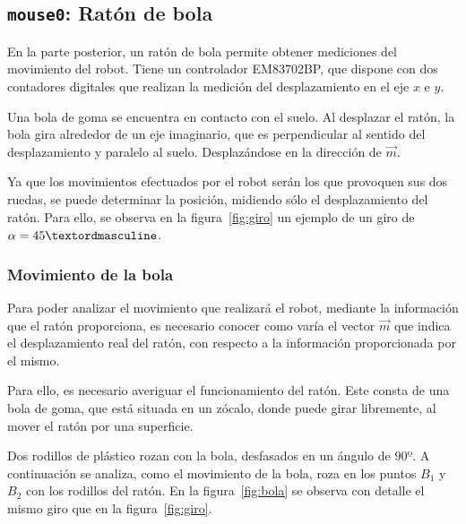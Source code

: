 \documentclass[10pt,a4paper,hidelinks,twocolumn]{article}
\begin{document}
\clearpage
\subsection{\texttt{mouse0}: Ratón de bola}

En la parte posterior, un ratón de bola permite obtener mediciones del movimiento del
robot. Tiene un controlador EM83702BP, que dispone con dos contadores digitales que
realizan la medición del desplazamiento en el eje $x$ e $y$.

Una bola de goma se encuentra en contacto con el suelo. Al desplazar el ratón, 
la bola gira alrededor de un eje imaginario, que es perpendicular al sentido del
desplazamiento y paralelo al suelo. Desplazándose en la dirección de $\vec{m}$.

Ya que los movimientos efectuados por el robot serán los que provoquen sus dos ruedas,
se puede determinar la posición, midiendo sólo el desplazamiento del ratón. Para ello,
se observa en la figura~\ref{fig:giro} un ejemplo de un giro de $\alpha = \RobotAngleº$.


\subsubsection{Movimiento de la bola}
Para poder analizar el movimiento que realizará el robot, mediante la 
información que el ratón proporciona, es necesario conocer como varía el vector 
$\vec{m}$ que indica el desplazamiento real del ratón, con respecto a la 
información proporcionada por el mismo.

Para ello, es necesario averiguar el funcionamiento del ratón. Este consta de 
una bola de goma, que está situada en un zócalo, donde puede girar libremente, 
al mover el ratón por una superficie.

Dos rodillos de plástico rozan con la bola, desfasados en un ángulo de $90º$. A 
continuación se analiza, como el movimiento de la bola, roza en los puntos $B_1$ 
y $B_2$ con los rodillos del ratón. En la figura~\ref{fig:bola} se observa con 
detalle el mismo giro que en la figura~\ref{fig:giro}.

\end{document}
